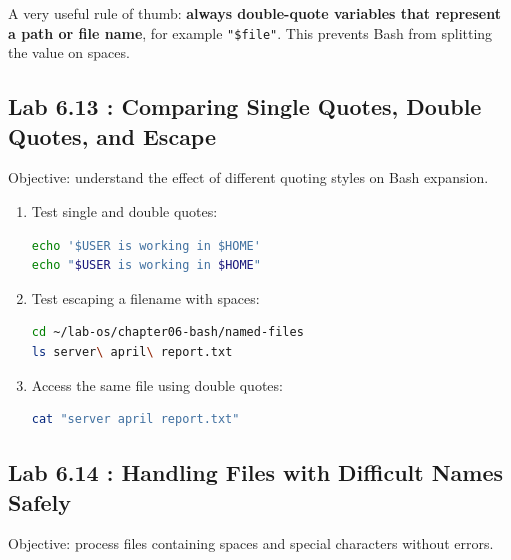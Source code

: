 \begin{tipbox}
A very useful rule of thumb: \textbf{always double-quote variables that
represent a path or file name}, for example \texttt{"\$file"}. This prevents
Bash from splitting the value on spaces.
\end{tipbox}

\subsection*{Lab 6.13 : Comparing Single Quotes, Double Quotes, and Escape}

Objective: understand the effect of different quoting styles on Bash
expansion.

\begin{enumerate}
  \item Test single and double quotes:
\begin{lstlisting}[language=bash, caption={Testing the difference between quote types}]
echo '$USER is working in $HOME'
echo "$USER is working in $HOME"
\end{lstlisting}

  \item Test escaping a filename with spaces:
\begin{lstlisting}[language=bash, caption={Using escape on a path with spaces}]
cd ~/lab-os/chapter06-bash/named-files
ls server\ april\ report.txt
\end{lstlisting}

  \item Access the same file using double quotes:
\begin{lstlisting}[language=bash, caption={Using double quotes on a path with spaces}]
cat "server april report.txt"
\end{lstlisting}
\end{enumerate}

\subsection*{Lab 6.14 : Handling Files with Difficult Names Safely}

Objective: process files containing spaces and special characters without
errors.


